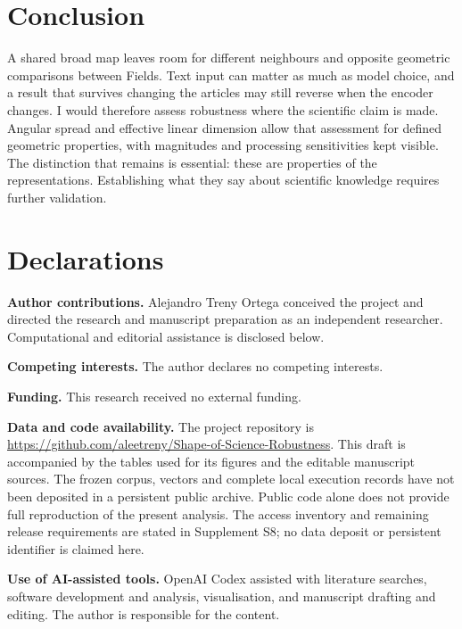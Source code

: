\documentclass[12pt]{article}
\begin{document}
\section{Conclusion}
A shared broad map leaves room for different neighbours and opposite geometric comparisons between Fields. Text input can matter as much as model choice, and a result that survives changing the articles may still reverse when the encoder changes. I would therefore assess robustness where the scientific claim is made. Angular spread and effective linear dimension allow that assessment for defined geometric properties, with magnitudes and processing sensitivities kept visible. The distinction that remains is essential: these are properties of the representations. Establishing what they say about scientific knowledge requires further validation.

\section*{Declarations}
\textbf{Author contributions.}
Alejandro Treny Ortega conceived the project and directed the research and manuscript preparation as an independent researcher. Computational and editorial assistance is disclosed below.
\par\medskip
\textbf{Competing interests.}
The author declares no competing interests.
\par\medskip
\textbf{Funding.}
This research received no external funding.
\par\medskip
\textbf{Data and code availability.}
The project repository is \url{https://github.com/aleetreny/Shape-of-Science-Robustness}. This draft is accompanied by the tables used for its figures and the editable manuscript sources. The frozen corpus, vectors and complete local execution records have not been deposited in a persistent public archive. Public code alone does not provide full reproduction of the present analysis. The access inventory and remaining release requirements are stated in Supplement S8; no data deposit or persistent identifier is claimed here.
\par\medskip
\textbf{Use of AI-assisted tools.}
OpenAI Codex assisted with literature searches, software development and analysis, visualisation, and manuscript drafting and editing. The author is responsible for the content.



\end{document}
